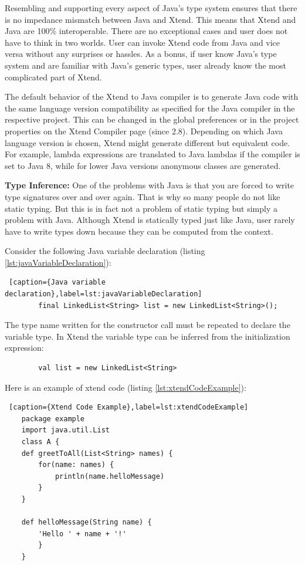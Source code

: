 	Resembling and supporting every aspect of Java's type system ensures that there is no impedance mismatch between Java and Xtend. This means that Xtend and Java are 100\% interoperable. There are no exceptional cases and user does not have to think in two worlds. User can invoke Xtend code from Java and vice versa without any surprises or hassles. As a bonus, if user know Java's type system and are familiar with Java's generic types, user already know the most complicated part of Xtend.
	
	The default behavior of the Xtend to Java compiler is to generate Java code with the same language version compatibility as specified for the Java compiler in the respective project. This can be changed in the global preferences or in the project properties on the Xtend  Compiler page (since 2.8). Depending on which Java language version is chosen, Xtend might generate different but equivalent code. For example, lambda expressions are translated to Java lambdas if the compiler is set to Java 8, while for lower Java versions anonymous classes are generated.
	
	\textbf{Type Inference:}
	One of the problems with Java is that you are forced to write type signatures over and over again. That is why so many people do not like static typing. But this is in fact not a problem of static typing but simply a problem with Java. Although Xtend is statically typed just like Java, user rarely have to write types down because they can be computed from the context.
	
	Consider the following Java variable declaration (listing \ref{lst:javaVariableDeclaration}):
	\begin{lstlisting} [caption={Java variable declaration},label=lst:javaVariableDeclaration]
		final LinkedList<String> list = new LinkedList<String>();
	\end{lstlisting}
	The type name written for the constructor call must be repeated to declare the variable type. In Xtend the variable type can be inferred from the initialization expression:
	\begin{lstlisting}
		val list = new LinkedList<String>
	\end{lstlisting}
		
	Here is an example of xtend code (listing \ref{lst:xtendCodeExample}):
	\begin{lstlisting} [caption={Xtend Code Example},label=lst:xtendCodeExample]
	package example	
	import java.util.List		
	class A {
	def greetToAll(List<String> names) {
		for(name: names) {
			println(name.helloMessage)
		}
	}
		
	def helloMessage(String name) {
		'Hello ' + name + '!'
		}
	}
	
	\end{lstlisting} 
	   
